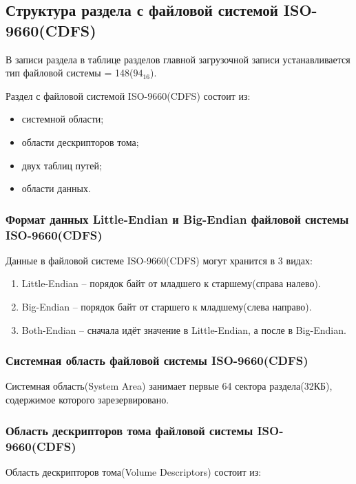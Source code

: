 \subsection{Структура раздела с файловой системой ISO-9660(CDFS)}

В записи раздела в таблице разделов главной загрузочной записи устанавливается тип файловой системы = 148($94_{16}$).

Раздел с файловой системой ISO-9660(CDFS) состоит из:

\begin{itemize}
\item системной области;
\item области дескрипторов тома;
\item двух таблиц путей;
\item области данных.
\end{itemize}

\subsubsection{Формат данных Little-Endian и Big-Endian файловой системы ISO-9660(CDFS)}

Данные в файловой системе ISO-9660(CDFS) могут хранится в 3 видах:

\begin{enumerate}
\item Little-Endian -- порядок байт от младшего к старшему(справа налево).
\item Big-Endian -- порядок байт от старшего к младшему(слева направо).
\item Both-Endian -- сначала идёт значение в Little-Endian, а после в Big-Endian.
\end{enumerate}

\subsubsection{Системная область файловой системы ISO-9660(CDFS)}

Системная область(System Area) занимает первые 64 сектора раздела(32КБ), содержимое которого зарезервировано.

\subsubsection{Область дескрипторов тома файловой системы ISO-9660(CDFS)}

Область дескрипторов тома(Volume Descriptors) состоит из:

